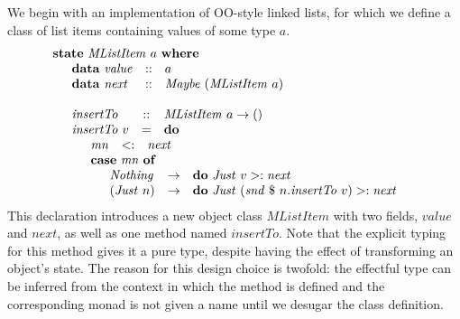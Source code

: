 \documentclass[runningheads,a4paper]{llncs}
\begin{document}
We begin with an implementation of OO-style linked lists, for which we define a class of list items containing values of some type $a$.
\begin{displaymath}
\begin{array}{l}
\mathbf{state}~\mathit{MListItem}~a~\mathbf{where} \\
\quad \begin{array}{lcl}
\mathbf{data}~\mathit{value} & :: & a \\
\mathbf{data}~\mathit{next}  & :: & \mathit{Maybe}~(\mathit{MListItem}~a)
\end{array}\\\\
\quad \begin{array}{lcl}
\mathit{insertTo} & :: & \mathit{MListItem}~a \to ()\\
\mathit{insertTo}~v & = & \mathbf{do} \\
\multicolumn{3}{l}{\quad \begin{array}{lcl}
\mathit{mn} & <: & \mathit{next} \\
\multicolumn{3}{l}{\mathbf{case}~\mathit{mn}~\mathbf{of}} \\
\multicolumn{3}{l}{\quad \begin{array}{lcl}
\mathit{Nothing} & \to & \mathbf{do}~\mathit{Just}~v >: \mathit{next} \\
(\mathit{Just}~n) & \to & \mathbf{do}~\mathit{Just}~(\mathit{snd}~\$~n.\mathit{insertTo}~v) >: \mathit{next}
\end{array}}
\end{array}}
\end{array}
\end{array}
\end{displaymath}
This declaration introduces a new object class $\mathit{MListItem}$ with two fields, $\mathit{value}$ and $\mathit{next}$, as well as one method named $\mathit{insertTo}$. Note that the explicit typing for this method gives it a pure type, despite having the effect of transforming an object's state. The reason for this design choice is twofold: the effectful type can be inferred from the context in which the method is defined and the corresponding monad is not given a name until we desugar the class definition. %
\end{document}
